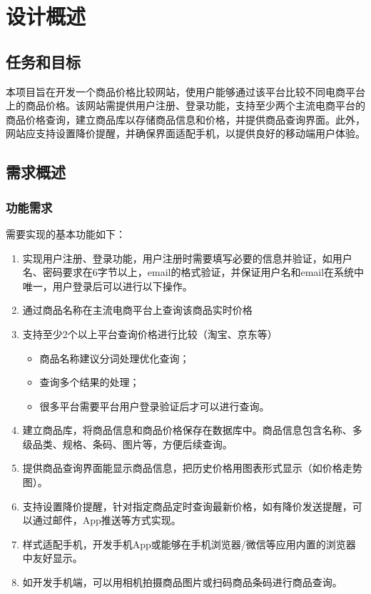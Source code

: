 \documentclass[12pt]{article}
\begin{document}
\section{设计概述}

\subsection{任务和目标}
本项目旨在开发一个商品价格比较网站，使用户能够通过该平台比较不同电商平台上的商品价格。该网站需提供用户注册、登录功能，支持至少两个主流电商平台的商品价格查询，建立商品库以存储商品信息和价格，并提供商品查询界面。此外，网站应支持设置降价提醒，并确保界面适配手机，以提供良好的移动端用户体验。

\subsection{需求概述}

\subsubsection{功能需求}
需要实现的基本功能如下：

\begin{enumerate}
    \item 实现用户注册、登录功能，用户注册时需要填写必要的信息并验证，如用户名、密码要求在6字节以上，email的格式验证，并保证用户名和email在系统中唯一，用户登录后可以进行以下操作。
    \item 通过商品名称在主流电商平台上查询该商品实时价格
    \item 支持至少2个以上平台查询价格进行比较（淘宝、京东等）
    \begin{itemize}
        \item 商品名称建议分词处理优化查询；
        \item 查询多个结果的处理；
        \item 很多平台需要平台用户登录验证后才可以进行查询。
    \end{itemize}
    \item 建立商品库，将商品信息和商品价格保存在数据库中。商品信息包含名称、多级品类、规格、条码、图片等，方便后续查询。
    \item 提供商品查询界面能显示商品信息，把历史价格用图表形式显示（如价格走势图）。
    \item 支持设置降价提醒，针对指定商品定时查询最新价格，如有降价发送提醒，可以通过邮件，App推送等方式实现。
    \item 样式适配手机，开发手机App或能够在手机浏览器/微信等应用内置的浏览器中友好显示。
    \item 如开发手机端，可以用相机拍摄商品图片或扫码商品条码进行商品查询。
\end{enumerate}
\end{document}
